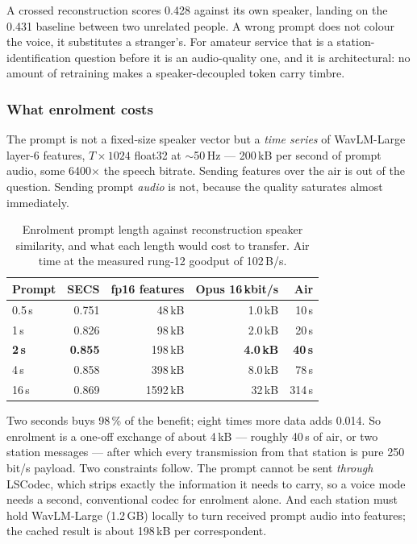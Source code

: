 A crossed reconstruction scores 0.428 against its own speaker, landing
on the 0.431 baseline between two unrelated people.  A wrong prompt
does not colour the voice, it substitutes a stranger's.  For amateur
service that is a station-identification question before it is an
audio-quality one, and it is architectural: no amount of retraining
makes a speaker-decoupled token carry timbre.

\subsubsection{What enrolment costs}

The prompt is not a fixed-size speaker vector but a \emph{time series}
of WavLM-Large layer-6 features, $T \times 1024$ float32 at
$\sim$50\,Hz --- 200\,kB per second of prompt audio, some
6400$\times$ the speech bitrate.  Sending features over the air is out
of the question.  Sending prompt \emph{audio} is not, because the
quality saturates almost immediately.

\begin{table}[H]
    \centering
    \caption{Enrolment prompt length against reconstruction speaker
             similarity, and what each length would cost to transfer.
             Air time at the measured rung-12 goodput of 102\,B/s.}
    \label{tab:voice_prompt}
    \small
    \begin{tabular}{@{}lrrrr@{}}
    \toprule
    \textbf{Prompt} & \textbf{SECS} & \textbf{fp16 features} &
    \textbf{Opus 16\,kbit/s} & \textbf{Air} \\
    \midrule
    0.5\,s & 0.751 &  48\,kB & 1.0\,kB & 10\,s \\
    1\,s   & 0.826 &  98\,kB & 2.0\,kB & 20\,s \\
    \textbf{2\,s} & \textbf{0.855} & 198\,kB & \textbf{4.0\,kB} &
    \textbf{40\,s} \\
    4\,s   & 0.858 & 398\,kB & 8.0\,kB & 78\,s \\
    16\,s  & 0.869 & 1592\,kB & 32\,kB & 314\,s \\
    \bottomrule
    \end{tabular}
\end{table}

Two seconds buys 98\,\% of the benefit; eight times more data adds
0.014.  So enrolment is a one-off exchange of about 4\,kB --- roughly
40\,s of air, or two station messages --- after which every
transmission from that station is pure 250\,bit/s payload.  Two
constraints follow.  The prompt cannot be sent \emph{through} LSCodec,
which strips exactly the information it needs to carry, so a voice mode
needs a second, conventional codec for enrolment alone.  And each
station must hold WavLM-Large (1.2\,GB) locally to turn received
prompt audio into features; the cached result is about 198\,kB per
correspondent.

